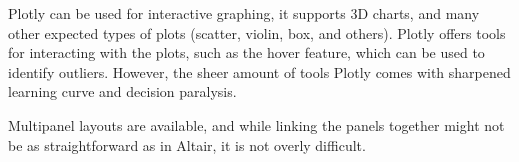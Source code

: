 Plotly can be used for interactive graphing, it supports 3D charts, and many other expected types of plots (scatter, violin, box, and others). Plotly offers tools for interacting with the plots, such as the hover feature, which can be used to identify outliers. However, the sheer amount of tools Plotly comes with sharpened learning curve and decision paralysis. 

Multipanel layouts are available, and while linking the panels together might not be as straightforward as in Altair, it is not overly difficult. 








